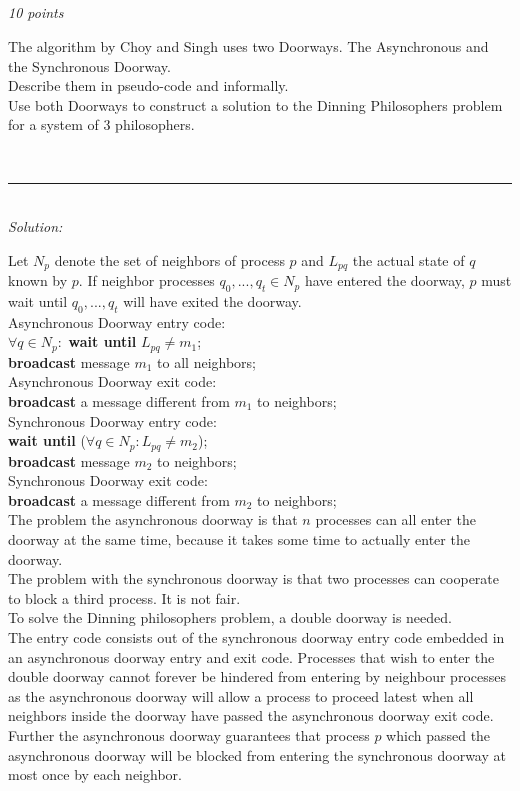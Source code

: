 \documentclass[a4paper]{article}
\newcommand{\horrule}[1]{\rule{\linewidth}{#1}} %
\newcommand{\points}[1]{\subsection{} \textit{#1 points}\\}
\newcommand{\question}[2][]{
  \noindent
  \parbox[t]{\textwidth}{#1 \parbox[t]{0.95\textwidth}{#2}}\\
}
\newcommand{\solution}[1]{\horrule{0.5pt}\\[3pt]\textit{Solution: }\\\begin{minipage}{\textwidth}#1\end{minipage}}
\begin{document}
\points{10}
\question{
  The algorithm by Choy and Singh uses two Doorways. The Asynchronous
  and the Synchronous Doorway. \\ Describe them in pseudo-code and
  informally. \\ Use both Doorways to construct a solution to the
  Dinning Philosophers problem for a system of 3 philosophers.
}
\solution{
  Let $N_p$ denote the set of neighbors of process $p$ and $L_{pq}$
  the actual state of $q$ known by $p$. If neighbor processes
  $q_0,...,q_t \in N_p$ have entered the doorway, $p$ must wait until
  $q_0,...,q_t$ will have exited the doorway.\\[0.1cm]

  Asynchronous Doorway entry code:\\
  $\forall q \in N_p:$ \textbf{wait until} $L_{pq} \neq m_1$;\\
  \textbf{broadcast} message $m_1$ to all neighbors;\\[0.1cm]

  Asynchronous Doorway exit code:\\
  \textbf{broadcast} a message different from $m_1$ to neighbors;\\[0.1cm]

  Synchronous Doorway entry code:\\
  \textbf{wait until} ($\forall q \in N_p: L_{pq} \neq m_2$);\\
  \textbf{broadcast} message $m_2$ to neighbors;\\[0.1cm]

  Synchronous Doorway exit code:\\
  \textbf{broadcast} a message different from $m_2$ to neighbors;\\[0.1cm]

  The problem the asynchronous doorway is that $n$ processes can all
  enter the doorway at the same time, because it takes some time to
  actually enter the doorway.\\[0.1cm]

  The problem with the synchronous doorway is that two processes can
  cooperate to block a third process. It is not fair.\\[0.1cm]

  To solve the Dinning philosophers problem, a double doorway is
  needed.\\
  The entry code consists out of the synchronous doorway entry code
  embedded in an asynchronous doorway entry and exit code. Processes
  that wish to enter the double doorway cannot forever be hindered from
  entering by neighbour processes as the asynchronous doorway will allow
  a process to proceed latest when all neighbors inside the doorway
  have passed the asynchronous doorway exit code. Further the
  asynchronous doorway guarantees that process $p$ which passed the
  asynchronous doorway will be blocked from entering the synchronous
  doorway at most once by each neighbor.

}
\end{document}

